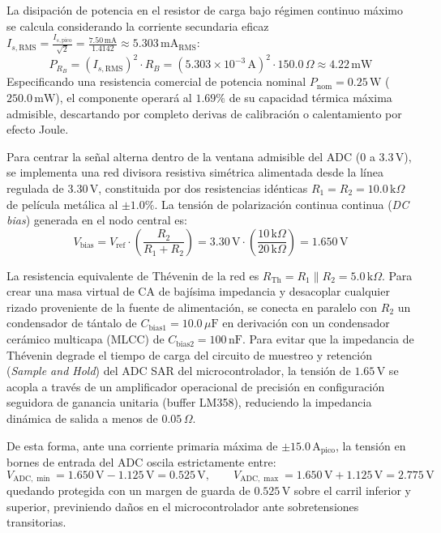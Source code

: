 La disipación de potencia en el resistor de carga bajo régimen continuo máximo se calcula considerando la corriente secundaria eficaz $I_{s,\text{RMS}} = \frac{I_{s,\text{pico}}}{\sqrt{2}} = \frac{7.50\,\text{mA}}{1.4142} \approx 5.303\,\text{mA}_{\text{RMS}}$:
\begin{equation}
P_{R_B} = (I_{s,\text{RMS}})^2 \cdot R_B = (5.303 \times 10^{-3}\,\text{A})^2 \cdot 150.0\,\Omega \approx 4.22\,\text{mW}
\label{eq:mp_disipacion_rb}
\end{equation}
Especificando una resistencia comercial de potencia nominal $P_{\text{nom}} = 0.25\,\text{W}$ ($250.0\,\text{mW}$), el componente operará al $1.69\%$ de su capacidad térmica máxima admisible, descartando por completo derivas de calibración o calentamiento por efecto Joule.

Para centrar la señal alterna dentro de la ventana admisible del ADC ($0$ a $3.3\,\text{V}$), se implementa una red divisora resistiva simétrica alimentada desde la línea regulada de $3.30\,\text{V}$, constituida por dos resistencias idénticas $R_1 = R_2 = 10.0\,\text{k}\Omega$ de película metálica al $\pm 1.0\%$. La tensión de polarización continua continua (\textit{DC bias}) generada en el nodo central es:
\begin{equation}
V_{\text{bias}} = V_{\text{ref}} \cdot \left(\frac{R_2}{R_1 + R_2}\right) = 3.30\,\text{V} \cdot \left(\frac{10\,\text{k}\Omega}{20\,\text{k}\Omega}\right) = 1.650\,\text{V}
\label{eq:mp_voltaje_bias}
\end{equation}

La resistencia equivalente de Thévenin de la red es $R_{\text{Th}} = R_1 \parallel R_2 = 5.0\,\text{k}\Omega$. Para crear una masa virtual de CA de bajísima impedancia y desacoplar cualquier rizado proveniente de la fuente de alimentación, se conecta en paralelo con $R_2$ un condensador de tántalo de $C_{\text{bias1}} = 10.0\,\mu\text{F}$ en derivación con un condensador cerámico multicapa (MLCC) de $C_{\text{bias2}} = 100\,\text{nF}$. Para evitar que la impedancia de Thévenin degrade el tiempo de carga del circuito de muestreo y retención (\textit{Sample and Hold}) del ADC SAR del microcontrolador, la tensión de $1.65\,\text{V}$ se acopla a través de un amplificador operacional de precisión en configuración seguidora de ganancia unitaria (buffer LM358), reduciendo la impedancia dinámica de salida a menos de $0.05\,\Omega$.

De esta forma, ante una corriente primaria máxima de $\pm 15.0\,\text{A}_{\text{pico}}$, la tensión en bornes de entrada del ADC oscila estrictamente entre:
\begin{equation}
V_{\text{ADC},\min} = 1.650\,\text{V} - 1.125\,\text{V} = 0.525\,\text{V}, \qquad V_{\text{ADC},\max} = 1.650\,\text{V} + 1.125\,\text{V} = 2.775\,\text{V}
\label{eq:mp_rango_adc}
\end{equation}
quedando protegida con un margen de guarda de $0.525\,\text{V}$ sobre el carril inferior y superior, previniendo daños en el microcontrolador ante sobretensiones transitorias.

